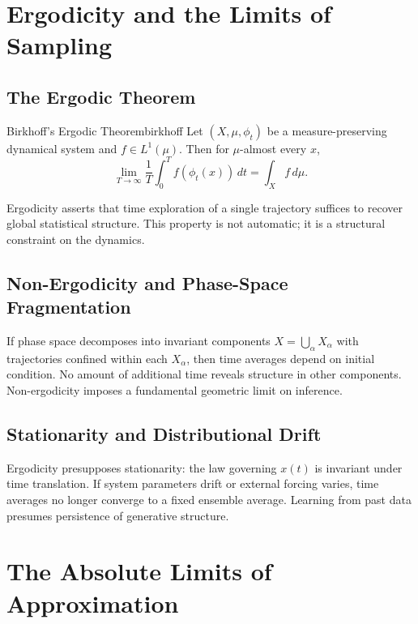 \documentclass[12pt,openany]{book}
\begin{document}
\chapter{Ergodicity and the Limits of Sampling}
\label{ch:ergodicity}

\section{The Ergodic Theorem}

\begin{theorem}{Birkhoff's Ergodic Theorem}{birkhoff}
  Let $(X,\mu,\phi_t)$ be a measure-preserving dynamical system and
  $f\in L^1(\mu)$. Then for $\mu$-almost every $x$,
  \[
    \lim_{T\to\infty}\frac{1}{T}\int_0^T f(\phi_t(x))\,dt
    = \int_X f\,d\mu.
  \]
\end{theorem}

Ergodicity asserts that time exploration of a single trajectory suffices to
recover global statistical structure. This property is not automatic; it is a
structural constraint on the dynamics.

\section{Non-Ergodicity and Phase-Space Fragmentation}

If phase space decomposes into invariant components $X=\bigcup_\alpha X_\alpha$
with trajectories confined within each $X_\alpha$, then time averages depend on
initial condition. No amount of additional time reveals structure in other
components. Non-ergodicity imposes a fundamental geometric limit on inference.

\section{Stationarity and Distributional Drift}

Ergodicity presupposes stationarity: the law governing $x(t)$ is invariant
under time translation. If system parameters drift or external forcing varies,
time averages no longer converge to a fixed ensemble average. Learning from
past data presumes persistence of generative structure.

\chapter{The Absolute Limits of Approximation}
\label{ch:limits}
\end{document}
